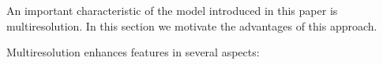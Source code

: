 
An important characteristic of the model introduced in this paper is
multiresolution. In this section we motivate the advantages of this
approach.


Multiresolution enhances  features in several aspects:

